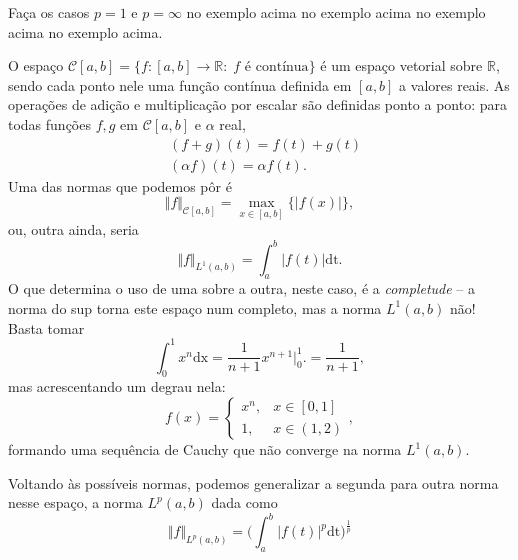 \documentclass[../functional_analysis.tex]{subfiles}
\begin{document}
\begin{exr}
	Faça os casos \(p=1\) e \(p=\infty\) no exemplo acima no exemplo acima no exemplo acima no exemplo acima.
\end{exr}


\begin{example}
	O espaço \(\mathcal{C}[a, b] = \{f:[a, b]\rightarrow \mathbb{R}:\; f \text{ é contínua}\}\) é um espaço vetorial sobre \(\mathbb{R}\), sendo cada ponto nele uma função contínua definida em \([a, b]\) a valores reais. As operações de adição e multiplicação por escalar são definidas ponto a ponto: para todas funções \(f, g\) em \(\mathcal{C}[a, b]\) e \(\alpha \) real,
	\begin{align*}
		 & (f+g)(t) = f(t) + g(t)       \\
		 & (\alpha f)(t) = \alpha f(t).
	\end{align*}
	Uma das normas que podemos pôr é
	\[
		\Vert f \Vert_{\mathcal{C}[a, b]} = \max\limits_{x\in [a, b]}\{|f(x)|\},
	\]
	ou, outra ainda, seria
	\[
		\Vert f \Vert_{L^{1}(a, b)} = \int_{a}^{b}|f(t)| \mathrm{dt}.
	\]
	O que determina o uso de uma sobre a outra, neste caso, é a \textit{completude} -- a norma do sup torna este espaço num completo, mas a norma \(L^{1}(a, b)\) não! Basta tomar
	\[
		\int_{0}^{1}x^{n} \mathrm{dx}= \frac{1}{n+1}x^{n+1}\biggl|_{0}^{1}\biggr. = \frac{1}{n+1},
	\]
	mas acrescentando um degrau nela:
	\[
		f(x) = \left\{\begin{array}{ll}
			x^{n}, & x\in [0, 1] \\
			1,     & x\in (1, 2)
		\end{array}\right.,
	\]
	formando uma sequência de Cauchy que não converge na norma \(L^{1}(a, b)\).

	Voltando às possíveis normas, podemos generalizar a segunda para outra norma nesse espaço, a norma \(L^{p}(a, b)\) dada como
	\[
		\Vert f \Vert_{L^{p}(a, b)} = \biggl(\int_{a}^{b}|f(t)|^{p} \mathrm{dt}\biggr)^{\frac{1}{p}}
	\]
\end{example}
\end{document}
